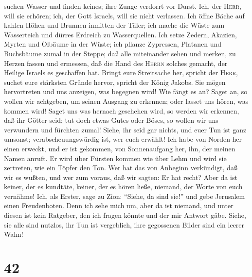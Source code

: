 suchen Wasser und finden keines; ihre Zunge verdorrt vor Durst. Ich, der
\textsc{Herr}, will sie erhören; ich, der Gott Israels, will sie nicht
verlassen.  Ich öffne Bäche auf kahlen Höhen und Brunnen
inmitten der Täler; ich mache die Wüste zum Wasserteich und dürres
Erdreich zu Wasserquellen.  Ich setze Zedern, Akazien,
Myrten und Ölbäume in der Wüste; ich pflanze Zypressen, Platanen und
Buchsbäume zumal in der Steppe;  daß alle miteinander
sehen und merken, zu Herzen fassen und ermessen, daß die Hand des
\textsc{Herrn} solches gemacht, der Heilige Israels es geschaffen hat.
 Bringt eure Streitsache her, spricht der \textsc{Herr},
suchet eure stärksten Gründe hervor, spricht der König Jakobs.
 Sie mögen hervortreten und uns anzeigen, was begegnen
wird! Wie fängt es an? Saget an, so wollen wir achtgeben, um seinen
Ausgang zu erkennen; oder lasset uns hören, was kommen wird!
 Saget uns was hernach geschehen wird, so werden wir
erkennen, daß ihr Götter seid; tut doch etwas Gutes oder Böses, so
wollen wir uns verwundern und fürchten zumal!  Siehe, ihr
seid gar nichts, und euer Tun ist ganz umsonst; verabscheuungswürdig
ist, wer euch erwählt!  Ich habe von Norden her einen
erweckt, und er ist gekommen, von Sonnenaufgang her, ihn, der meinen
Namen anruft. Er wird über Fürsten kommen wie über Lehm und wird sie
zertreten, wie ein Töpfer den Ton.  Wer hat das von
Anbeginn verkündigt, daß wir es wußten, und wer zum voraus, daß wir
sagten: Er hat recht? Aber da ist keiner, der es kundtäte, keiner, der
es hören ließe, niemand, der Worte von euch vernähme! 
Ich, als Erster, sage zu Zion: ``Siehe, da sind sie!'' und gebe
Jerusalem einen Freudenboten.  Denn ich sehe mich um,
aber da ist niemand, und unter diesen ist kein Ratgeber, den ich fragen
könnte und der mir Antwort gäbe.  Siehe, sie alle sind
nutzlos, ihr Tun ist vergeblich, ihre gegossenen Bilder sind ein leerer
Wahn!

\hypertarget{section-41}{%
\section{42}\label{section-41}}

